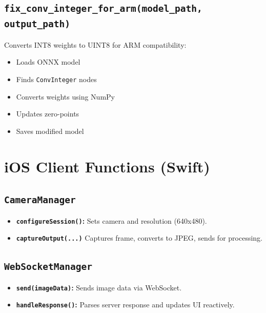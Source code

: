 \documentclass[11pt]{report}
\begin{document}
\subsection{\texttt{fix\_conv\_integer\_for\_arm(model\_path, output\_path)}}
Converts INT8 weights to UINT8 for ARM compatibility:
\begin{itemize}
    \item Loads ONNX model
    \item Finds \texttt{ConvInteger} nodes
    \item Converts weights using NumPy
    \item Updates zero-points
    \item Saves modified model
\end{itemize}

\section{iOS Client Functions (Swift)}

\subsection{\texttt{CameraManager}}
\begin{itemize}
    \item \textbf{\texttt{configureSession()}:} Sets camera and resolution (640x480).
    \item \textbf{\texttt{captureOutput(...)}} Captures frame, converts to JPEG, sends for processing.
\end{itemize}

\subsection{\texttt{WebSocketManager}}
\begin{itemize}
    \item \textbf{\texttt{send(imageData)}:} Sends image data via WebSocket.
    \item \textbf{\texttt{handleResponse()}:} Parses server response and updates UI reactively.
\end{itemize}
\end{document}
